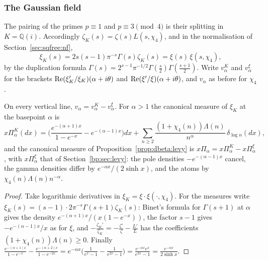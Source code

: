 \subsubsection{The Gaussian field}\label{sec:dbeta:qi}

The pairing of the primes $p\equiv1$ and $p\equiv3\pmod4$ is their splitting in $K=\mathbb Q(i)$. Accordingly $\zeta_K(s)=\zeta(s)L(s,\chi_4)$, and in the normalisation of Section~\ref{sec:sqfree:nf},
\[
\xi_K(s)=2s(s-1)\pi^{-s}\Gamma(s)\zeta_K(s)=\xi(s)\,\xi(s,\chi_4),
\]
by the duplication formula $\Gamma(s)=2^{s-1}\pi^{-1/2}\Gamma(\frac s2)\Gamma(\frac{s+1}2)$. Write $v^K_\alpha$ and $v^\xi_\alpha$ for the brackets $\operatorname{Re}(\xi_K'/\xi_K)(\alpha+i\theta)$ and $\operatorname{Re}(\xi'/\xi)(\alpha+i\theta)$, and $v_\alpha$ as before for $\chi_4$.

\begin{proposition}\label{prop:dbeta:factor}
On every vertical line, $v_\alpha=v^K_\alpha-v^\xi_\alpha$. For $\alpha>1$ the canonical measure of $\xi_K$ at the basepoint $\alpha$ is
\[
x\Pi^K_\alpha(dx)=\Big(\frac{e^{-(\alpha+1)x}}{1-e^{-x}}-e^{-(\alpha-1)x}\Big)dx+\sum_{n\ge2}\frac{(1+\chi_4(n))\Lambda(n)}{n^\alpha}\,\delta_{\log n}(dx),
\]
and the canonical measure of Proposition~\ref{prop:dbeta:levy} is $x\Pi_\alpha=x\Pi^K_\alpha-x\Pi^\xi_\alpha$, with $x\Pi^\xi_\alpha$ that of Section~\ref{bp:sec:levy}: the pole densities $-e^{-(\alpha-1)x}$ cancel, the gamma densities differ by $e^{-\alpha x}/(2\sinh x)$, and the atoms by $\chi_4(n)\Lambda(n)n^{-\alpha}$.
\end{proposition}

\begin{proof}
Take logarithmic derivatives in $\xi_K=\xi\cdot\xi(\cdot,\chi_4)$. For the measures write $\xi_K(s)=(s-1)\cdot2\pi^{-s}\Gamma(s+1)\zeta_K(s)$: Binet's formula for $\Gamma(s+1)$ at $\alpha$ gives the density $e^{-(\alpha+1)x}/(x(1-e^{-x}))$, the factor $s-1$ gives $-e^{-(\alpha-1)x}/x$ as for $\xi$, and $-\frac{\zeta_K'}{\zeta_K}=-\frac{\zeta'}\zeta-\frac{L'}L$ has the coefficients $(1+\chi_4(n))\Lambda(n)\ge0$. Finally $\frac{e^{-(\alpha+1)x}}{1-e^{-x}}-\frac{e^{-(\alpha+2)x}}{1-e^{-2x}}=e^{-\alpha x}\Big(\frac1{e^x-1}-\frac1{e^{2x}-1}\Big)=\frac{e^{-\alpha x}e^x}{e^{2x}-1}=\frac{e^{-\alpha x}}{2\sinh x}$.
\end{proof}


